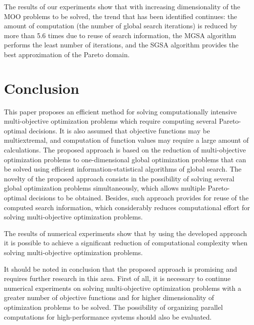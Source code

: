 \documentclass[runningheads]{llncs}
\begin{document}
The results of our experiments show that with increasing dimensionality of the MOO problems to be solved, the trend that has been identified continues: the amount of computation (the number of global search iterations) is reduced by more than 5.6 times due to reuse of search information, the MGSA algorithm performs the least number of iterations, and the SGSA algorithm provides the best approximation of the Pareto domain.

\section*{Conclusion}

This paper proposes an efficient method for solving computationally intensive multi-objective optimization problems which require computing several Pareto-optimal decisions. It is also assumed that objective functions may be multiextremal, and computation of function values may require a large amount of calculations. The proposed approach is based on the reduction of multi-objective optimization problems to one-dimensional global optimization problems that can be solved using efficient information-statistical algorithms of global search.  The novelty of the proposed approach consists in the possibility of solving several global optimization problems simultaneously, which allows multiple Pareto-optimal decisions to be obtained. Besides, such approach provides for reuse of the computed search information, which considerably reduces computational effort for solving multi-objective optimization problems. 

The results of numerical experiments show that by using the developed approach it is possible to achieve a significant reduction of computational complexity when solving multi-objective optimization problems. 

It should be noted in conclusion that the proposed approach is promising and requires further research in this area. First of all, it is necessary to continue numerical experiments on solving multi-objective optimization problems with a greater number of objective functions and for higher dimensionality of optimization problems to be solved. The possibility of organizing parallel computations for high-performance systems should also be evaluated.
\end{document}
